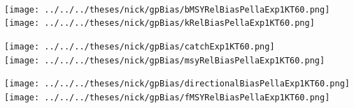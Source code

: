 \documentclass[ xcolor = pdftex, dvipsnames, table ]{beamer}
\begin{document}
%
\begin{frame}%
$~$
\hspace*{-1.25cm}
\begin{minipage}[h!]{0.33\textwidth}
\hspace*{0.25cm}
\texttt{[image: ../../../theses/nick/gpBias/bMSYRelBiasPellaExp1KT60.png]}\\
\hspace*{0.25cm}
\texttt{[image: ../../../theses/nick/gpBias/kRelBiasPellaExp1KT60.png]}
\end{minipage}
\begin{minipage}[h!]{0.33\textwidth}
\hspace*{0.75cm}
\texttt{[image: ../../../theses/nick/gpBias/catchExp1KT60.png]}\\
\hspace*{0.75cm}
\texttt{[image: ../../../theses/nick/gpBias/msyRelBiasPellaExp1KT60.png]}
\end{minipage}
\begin{minipage}[h!]{0.33\textwidth}
\hspace*{1cm}
\texttt{[image: ../../../theses/nick/gpBias/directionalBiasPellaExp1KT60.png]}\\
\hspace*{1cm}
\texttt{[image: ../../../theses/nick/gpBias/fMSYRelBiasPellaExp1KT60.png]}
\end{minipage}
\end{frame}
\end{document}
